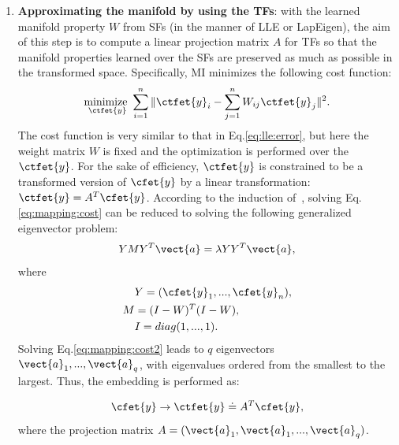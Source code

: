 \begin{enumerate} [leftmargin=4.5mm]
\begin{enumerate} [leftmargin=5mm]
   \end{enumerate}

 \item \textbf{Approximating the manifold by using the TFs}: with the
   learned manifold property $W$ from SFs (in the manner of LLE or
   LapEigen), the aim of this step is to compute a linear projection
   matrix $A$ for TFs so that the manifold properties learned over the
   SFs are preserved as much as possible in the transformed space. 
   Specifically, MI minimizes the following cost
   function:
   \begin{equation}
     \label{eq:mapping:cost}
         \begin{aligned}
         \underset{\ctfet{y}} {\text {minimize }}  \sum_{i=1}^n  \| \ctfet{y}_i - \sum_{j=1}^n W_{ij} \ctfet{y}_j \|^2. \\
         \end{aligned}
   \end{equation}
   The cost function is very similar to that in Eq.\ref{eq:lle:error},
   but here the weight matrix $W$ is fixed and the optimization is
   performed over the $\ctfet{y}$. For the sake of efficiency,
   $\ctfet{y}$ is constrained to be a transformed version of
   $\cfet{y}$ by a linear transformation: $\ctfet{y} = A^T\cfet{y}$.
According to the induction of~\citep{NPEmbedding:iccv05}, solving Eq.\ref{eq:mapping:cost} can be reduced to solving
   the following generalized eigenvector problem:
   \begin{equation}
     \label{eq:mapping:cost2}
         \begin{aligned}
           YMY^T \vect{a} = \lambda YY^T \vect{a},
         \end{aligned}
   \end{equation}
   where  
 \begin{align*}
     & Y = (\cfet{y}_1, ..., \cfet{y}_n), \\
     M &= (I-W)^T (I-W),   \\
     &I = diag(1, ..., 1).  
\end{align*}
Solving Eq.\ref{eq:mapping:cost2} leads to $q$ eigenvectors
$\vect{a}_1, ..., \vect{a}_q$, with eigenvalues ordered from the
smallest to the largest.  Thus, the embedding is performed as:

\begin{equation}
  \label{eq:embedding}
  \cfet{y} \to \ctfet{y} \doteq A^T \cfet{y}, 
\end{equation}
where the projection matrix $A = (\vect{a}_1, \vect{a}_1, ...,
\vect{a}_{q})$.
\end{enumerate}

